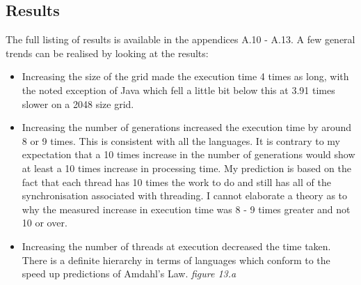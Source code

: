 \documentclass[11pt]{article} %
\begin{document}
\subsection{Results}
The full listing of results is available in the appendices A.10 - A.13. A few general trends can be realised by looking at the results:

\begin{itemize}
\item Increasing the size of the grid made the execution time 4 times as long, with the noted exception of Java which fell a little bit below this at 3.91 times slower on a 2048 size grid.
\item Increasing the number of generations increased the execution time by around 8 or 9 times. This is consistent with all the languages. It is contrary to my expectation that a 10 times increase in the number of generations would show at least a 10 times increase in processing time. My prediction is based on the fact that each thread has 10 times the work to do and still has all of the synchronisation associated with threading. I cannot elaborate a theory as to why the measured increase in execution time was 8 - 9 times greater and not 10 or over.
\item Increasing the number of threads at execution decreased the time taken. There is a definite hierarchy in terms of languages which conform to the speed up predictions of Amdahl's Law. {\it figure 13.a}
\end{itemize}
\end{document}

